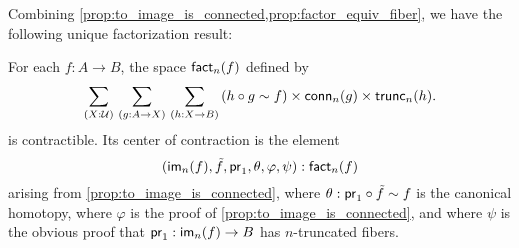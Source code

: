 
Combining \cref{prop:to_image_is_connected,prop:factor_equiv_fiber}, we have the following unique factorization result:

\begin{thm}\label{thm:orth-fact}
For each $f:A\to B$, the space $\mathsf{fact}_n(f)$ defined by
\begin{equation*}
\sm{X:\type}{g:A\to X}{h:X\to B} (h\circ g\htpy f)\times\mathsf{conn}_n(g)\times\mathsf{trunc}_n(h).
\end{equation*}
is contractible.
Its center of contraction is the element
\begin{equation*}
{\mathopen{}(\ensuremath{\mathsf{im}}_n(f),\tilde{f},\ensuremath{\mathsf{pr}_{1}},\theta,\varphi,\psi)\mathclose{}}:\mathsf{fact}_n(f)
\end{equation*}
arising from \cref{prop:to_image_is_connected},
where $\theta:\mathsf{pr}_{1}\circ\tilde{f}\sim f$ is the canonical homotopy, where $\varphi$ is the proof of
\cref{prop:to_image_is_connected}, and where $\psi$ is the obvious proof that $\mathsf{pr}_{1}:\mathsf{im}_n(f)\to B$ has $n$-truncated fibers.
\end{thm}

